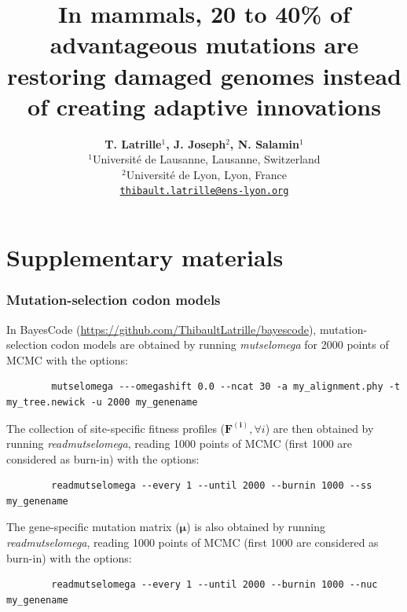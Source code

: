 \documentclass{article}
\title{In mammals, 20 to 40\% of advantageous mutations are restoring damaged genomes instead of creating adaptive innovations}
\author{
    \large
    \textbf{T. {Latrille}$^{1}$, J. {Joseph}$^{2}$, N. {Salamin}$^{1}$}\\
    \normalsize $^{1}$Université de Lausanne, Lausanne, Switzerland\\
    \normalsize $^{2}$Université de Lyon, Lyon, France \\
    \normalsize \texttt{\href{mailto:thibault.latrille@ens-lyon.org}{thibault.latrille@ens-lyon.org}} \\
}
\newcommand{\UniDimArray}[1]{\bm{#1}}
\begin{document}
    \maketitle
    \part*{Supplementary materials}
    \tableofcontents
    \clearpage


    \section{Mutation-selection codon models}\label{sec:site-specific-mutation-selection-codon-models}
    In BayesCode (\url{https://github.com/ThibaultLatrille/bayescode}), mutation-selection codon models are obtained by running \textit{mutselomega} for 2000 points of MCMC with the options:
    \begin{scriptsize}
        \begin{verbatim}
        mutselomega ---omegashift 0.0 --ncat 30 -a my_alignment.phy -t my_tree.newick -u 2000 my_genename
        \end{verbatim}
    \end{scriptsize}
    The collection of site-specific fitness profiles ($\UniDimArray{F^{(i)}}, \forall i$) are then obtained by running \textit{readmutselomega}, reading 1000 points of MCMC (first 1000 are considered as burn-in) with the options:
    \begin{scriptsize}
        \begin{verbatim}
        readmutselomega --every 1 --until 2000 --burnin 1000 --ss my_genename
        \end{verbatim}
    \end{scriptsize}
    The gene-specific mutation matrix ($\UniDimArray{\mu}$) is also obtained by running \textit{readmutselomega}, reading 1000 points of MCMC (first 1000 are considered as burn-in) with the options:
    \begin{scriptsize}
        \begin{verbatim}
        readmutselomega --every 1 --until 2000 --burnin 1000 --nuc my_genename
        \end{verbatim}
    \end{scriptsize}
\end{document}
